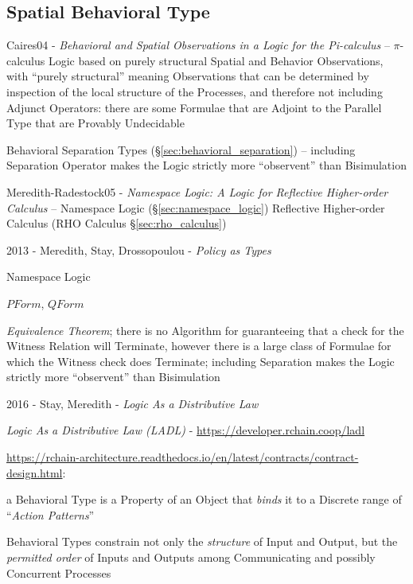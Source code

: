 \subsection{Spatial Behavioral Type}\label{sec:spatial_behavioral}

Caires04 - \emph{Behavioral and Spatial Observations in a Logic for the
  Pi-calculus} -- $\pi$-calculus Logic based on purely structural
Spatial and Behavior Observations, with ``purely structural'' meaning
Observations that can be determined by inspection of the local structure of the
Processes, and therefore not including Adjunct Operators:
there are some Formulae that are Adjoint to the Parallel Type that are Provably
Undecidable

\fist Behavioral Separation Types (\S\ref{sec:behavioral_separation}) --
including Separation Operator makes the Logic strictly more ``observent'' than
Bisimulation

Meredith-Radestock05 - \emph{Namespace Logic: A Logic for Reflective
  Higher-order Calculus} -- Namespace Logic (\S\ref{sec:namespace_logic})
Reflective Higher-order Calculus (RHO Calculus \S\ref{sec:rho_calculus})

2013 - Meredith, Stay, Drossopoulou - \emph{Policy as Types}

Namespace Logic

$PForm$, $QForm$

\emph{Equivalence Theorem}; there is no Algorithm for guaranteeing that a check
for the Witness Relation will Terminate, however there is a large class of
Formulae for which the Witness check does Terminate; including Separation makes
the Logic strictly more ``observent'' than Bisimulation

2016 - Stay, Meredith - \emph{Logic As a Distributive Law}

\emph{Logic As a Distributive Law (LADL)} -
\url{https://developer.rchain.coop/ladl}


\url{https://rchain-architecture.readthedocs.io/en/latest/contracts/contract-design.html}:

a Behavioral Type is a Property of an Object that \emph{binds} it to a Discrete
range of ``\emph{Action Patterns}''

Behavioral Types constrain not only the \emph{structure} of Input and Output,
but the \emph{permitted order} of Inputs and Outputs among Communicating and
possibly Concurrent Processes



